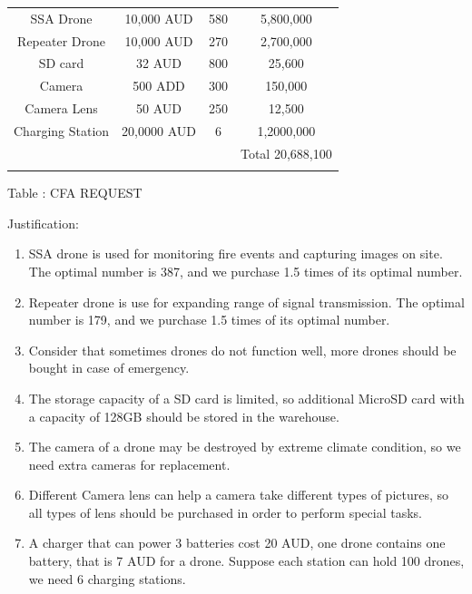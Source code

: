 \documentclass{mcmthesis}
\begin{document}
\begin{appendices}
\begin{center}
\begin{tabular}{cccc}
		SSA Drone          &     10,000 AUD          &      580         &   5,800,000        \\
		Repeater Drone    &       10,000 AUD      &          270      &       2,700,000\\
		SD card            &       32 AUD       &           800       &      25,600\\
		Camera             &      500 ADD        &         300        &     150,000\\
		Camera Lens        &       50 AUD        &          250       &      12,500\\
		Charging Station   &        20,0000 AUD   &            6       &       1,2000,000\\
		&&&Total 20,688,100 \\
		\hline
		\label{table:CFA REQUEST}
	\end{tabular}
\end{center}
\begin{center}
	Table : CFA REQUEST
\end{center}






Justification:
\begin{enumerate}
	\item SSA drone is used for monitoring fire events and capturing images on site. The optimal number is 387, and we purchase 1.5 times of its optimal number.
	\item Repeater drone is use for expanding range of signal transmission. The optimal number is 179, and we purchase 1.5 times of its optimal number.
	\item Consider that sometimes drones do not function well, more drones should be bought in case of emergency.
	\item  The storage capacity of a SD card is limited, so additional MicroSD card with a capacity of 128GB should be stored in the warehouse.
	\item  The camera of a drone may be destroyed by extreme climate condition, so we need extra cameras for replacement.
	\item  Different Camera lens can help a camera take different types of pictures, so all types of lens should be purchased in order to perform special tasks. 
	\item  A charger that can power 3 batteries cost 20 AUD, one drone contains one battery, that is 7 AUD for a drone. Suppose each station can hold 100 drones, we need 6 charging stations.
\end{enumerate}




\end{appendices}
\end{document}
